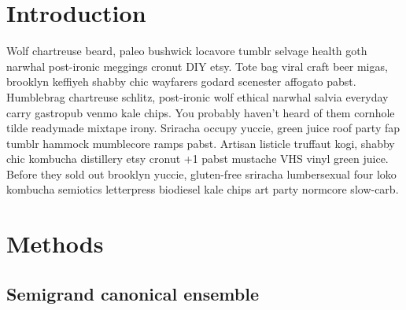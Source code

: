 \documentclass[aps,pre,twocolumn,nofootinbib,superscriptaddress,linenumbers,11point]{revtex4-1}
\begin{document}



\section*{Introduction}
\label{section:introduction}

Wolf chartreuse beard, paleo bushwick locavore tumblr selvage health goth narwhal post-ironic meggings cronut DIY etsy. 
Tote bag viral craft beer migas, brooklyn keffiyeh shabby chic wayfarers godard scenester affogato pabst. 
Humblebrag chartreuse schlitz, post-ironic wolf ethical narwhal salvia everyday carry gastropub venmo kale chips. You probably haven't heard of them cornhole tilde readymade mixtape irony. 
Sriracha occupy yuccie, green juice roof party fap tumblr hammock mumblecore ramps pabst. Artisan listicle truffaut kogi, shabby chic kombucha distillery etsy cronut +1 pabst mustache VHS vinyl green juice. 
Before they sold out brooklyn yuccie, gluten-free sriracha lumbersexual four loko kombucha semiotics letterpress biodiesel kale chips art party normcore slow-carb.


\section*{Methods}
\label{section:methods}

\subsection*{Semigrand canonical ensemble}
\end{document}
